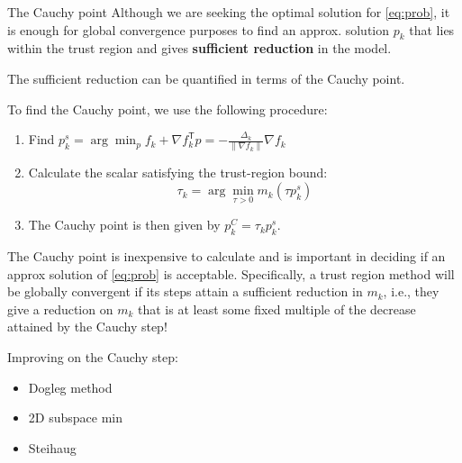 \documentclass{beamer}
\newcommand{\tran}{\mathsf{T}}
\begin{document}
\begin{frame}[allowframebreaks]{The Cauchy point}
	Although we are seeking the optimal solution for \eqref{eq:prob}, it is enough for global convergence purposes to find an approx. solution $p_k$ that lies within the trust region and gives \textbf{sufficient reduction} in the model.
	
	The sufficient reduction can be quantified in terms of the Cauchy point.
	
	To find the Cauchy point, we use the following procedure:
	
	\begin{enumerate}
		\item Find $p_k^s = \arg \min_{p} f_k + \nabla f_k^\tran p = -\frac{\Delta_k}{\|\nabla f_k \|} \nabla f_k$
		\item Calculate the scalar satisfying the trust-region bound:
		\[
			\tau_k = \arg \min_{\tau > 0} m_k (\tau p_k^s)
		\]
		\item The Cauchy point is then given by $p_k^C = \tau_k p_k^s$.
	\end{enumerate}

	The Cauchy point is inexpensive to calculate and is important in deciding if an approx solution of \eqref{eq:prob} is acceptable. Specifically, a trust region method will be globally convergent if its steps attain a sufficient reduction in $m_k$, i.e., they give a reduction on $m_k$ that is at least some fixed multiple of the decrease attained by the Cauchy step!
	
	Improving on the Cauchy step:
	
	\begin{itemize}
		\item Dogleg method
		\item 2D subspace min
		\item Steihaug
	\end{itemize}
\end{frame}

 
\end{document}
